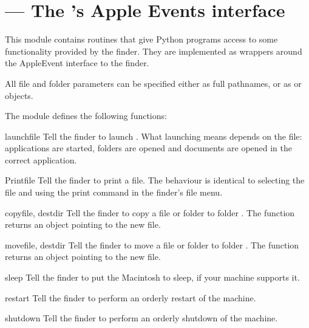 \section{ ---
         The 's Apple Events interface}



This module contains routines that give Python programs access to some
functionality provided by the finder. They are implemented as wrappers
around the AppleEvent interface to the finder.

All file and folder parameters can be specified either as full
pathnames, or as  or  objects.

The  module defines the following functions:


\begin{funcdesc}{launch}{file}
Tell the finder to launch . What launching means depends on the file:
applications are started, folders are opened and documents are opened
in the correct application.
\end{funcdesc}

\begin{funcdesc}{Print}{file}
Tell the finder to print a file. The behaviour is identical to selecting the file and using
the print command in the finder's file menu.
\end{funcdesc}

\begin{funcdesc}{copy}{file, destdir}
Tell the finder to copy a file or folder  to folder
. The function returns an  object pointing to
the new file.
\end{funcdesc}

\begin{funcdesc}{move}{file, destdir}
Tell the finder to move a file or folder  to folder
. The function returns an  object pointing to
the new file.
\end{funcdesc}

\begin{funcdesc}{sleep}{}
Tell the finder to put the Macintosh to sleep, if your machine
supports it.
\end{funcdesc}

\begin{funcdesc}{restart}{}
Tell the finder to perform an orderly restart of the machine.
\end{funcdesc}

\begin{funcdesc}{shutdown}{}
Tell the finder to perform an orderly shutdown of the machine.
\end{funcdesc}
